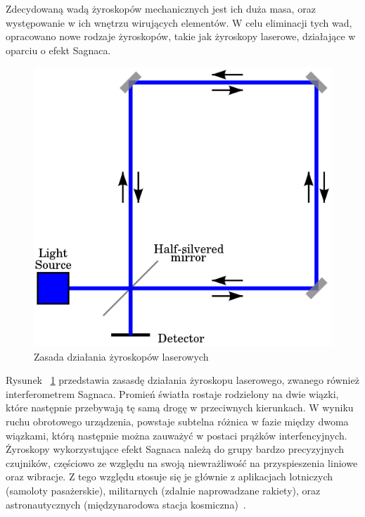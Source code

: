 Zdecydowaną wadą żyroskopów mechanicznych jest ich duża masa, oraz występowanie w ich wnętrzu wirujących elementów. W celu eliminacji tych wad, opracowano nowe rodzaje żyroskopów, takie jak żyroskopy laserowe, działające w oparciu o efekt Sagnaca.

\begin{figure}[H]
	\centering
	\includegraphics[scale=0.4]{Pictures/Sagnac_interferometer.png}
        \caption[Zasada działania żyroskopów laserowych]{Zasada działania żyroskopów laserowych~\cite{mems9}}
        \label{fig:300px-SagnacPhase}
\end{figure}

Rysunek ~\ref{fig:300px-SagnacPhase} przedstawia zasasdę działania żyroskopu laserowego, zwanego również interferometrem Sagnaca. Promień światła rostaje rodzielony na dwie wiązki, które następnie przebywają tę samą drogę w przeciwnych kierunkach. W wyniku ruchu obrotowego urządzenia, powstaje subtelna różnica w fazie między dwoma wiązkami, którą następnie można zauważyć w postaci prążków interfencyjnych. Żyroskopy wykorzystujące efekt Sagnaca należą do grupy bardzo precyzyjnych czujników, częściowo ze względu na swoją niewrażliwość na przyspieszenia liniowe oraz wibracje. Z tego względu stosuje się je głównie z aplikacjach lotniczych (samoloty pasażerskie), militarnych (zdalnie naprowadzane rakiety), oraz astronautycznych (międzynarodowa stacja kosmiczna)~\cite{mems7, mems8}. 

